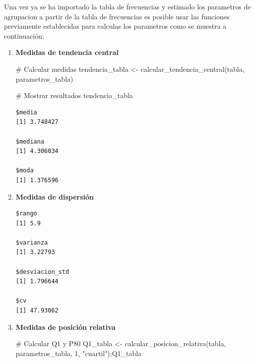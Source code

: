 \documentclass[
  spanish,
  letterpaper,
]{book}
\newenvironment{Shaded}{\begin{snugshade}}{\end{snugshade}}
\newcommand{\CommentTok}[1]{\textcolor[rgb]{0.37,0.37,0.37}{#1}}
\newcommand{\DecValTok}[1]{\textcolor[rgb]{0.68,0.00,0.00}{#1}}
\newcommand{\FunctionTok}[1]{\textcolor[rgb]{0.28,0.35,0.67}{#1}}
\newcommand{\NormalTok}[1]{\textcolor[rgb]{0.00,0.23,0.31}{#1}}
\newcommand{\OtherTok}[1]{\textcolor[rgb]{0.00,0.23,0.31}{#1}}
\newcommand{\SpecialCharTok}[1]{\textcolor[rgb]{0.37,0.37,0.37}{#1}}
\newcommand{\StringTok}[1]{\textcolor[rgb]{0.13,0.47,0.30}{#1}}
\begin{document}
Una vez ya se ha importado la tabla de frecuencias y estimado los
parametros de agrupacion a partir de la tabla de frecuencias es posible
usar las funciones previamente establecidas para calculas los parametros
como se muestra a continuación:

\begin{enumerate}
\def\labelenumi{\arabic{enumi}.}
\item
  \textbf{Medidas de tendencia central}

\begin{Shaded}
\begin{Highlighting}[]
\CommentTok{\# Calcular medidas}
\NormalTok{tendencia\_tabla }\OtherTok{\textless{}{-}} \FunctionTok{calcular\_tendencia\_central}\NormalTok{(tabla, parametros\_tabla)}

\CommentTok{\# Mostrar resultados }
\NormalTok{tendencia\_tabla}
\end{Highlighting}
\end{Shaded}

\begin{verbatim}
$media
[1] 3.748427

$mediana
[1] 4.306034

$moda
[1] 1.376596
\end{verbatim}
\item
  \textbf{Medidas de dispersión}

\begin{Shaded}
\end{Shaded}

\begin{verbatim}
$rango
[1] 5.9

$varianza
[1] 3.22793

$desviacion_std
[1] 1.796644

$cv
[1] 47.93062
\end{verbatim}
\item
  \textbf{Medidas de posición relativa}

\begin{Shaded}
\begin{Highlighting}[]
\CommentTok{\# Calcular Q1 y P80}
\NormalTok{Q1\_tabla }\OtherTok{\textless{}{-}} \FunctionTok{calcular\_posicion\_relativa}\NormalTok{(tabla, parametros\_tabla,}
                                       \DecValTok{1}\NormalTok{, }\StringTok{"cuartil"}\NormalTok{);Q1\_tabla}
\end{Highlighting}
\end{Shaded}


\end{enumerate}
\end{document}
